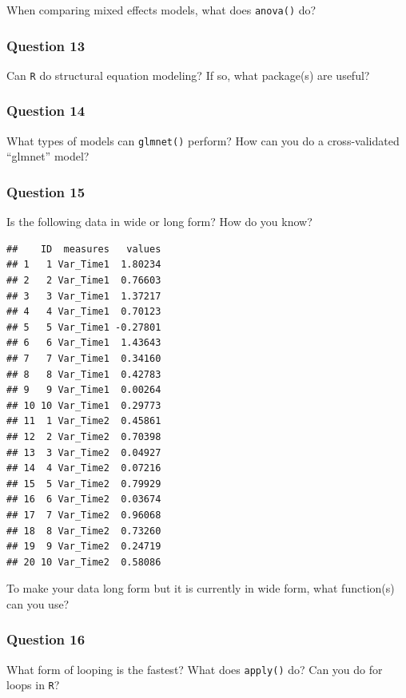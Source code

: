 \documentclass[]{tufte-book}
\theoremstyle{definition}
\theoremstyle{definition}
\theoremstyle{remark}
\begin{document}
When comparing mixed effects models, what does \texttt{anova()} do?

\subsubsection*{Question 13}\label{question-13}

Can \texttt{R} do structural equation modeling? If so, what package(s)
are useful?

\subsubsection*{Question 14}\label{question-14}

What types of models can \texttt{glmnet()} perform? How can you do a
cross-validated ``glmnet'' model?

\subsubsection*{Question 15}\label{question-15}

Is the following data in wide or long form? How do you know?

\begin{verbatim}
##    ID  measures   values
## 1   1 Var_Time1  1.80234
## 2   2 Var_Time1  0.76603
## 3   3 Var_Time1  1.37217
## 4   4 Var_Time1  0.70123
## 5   5 Var_Time1 -0.27801
## 6   6 Var_Time1  1.43643
## 7   7 Var_Time1  0.34160
## 8   8 Var_Time1  0.42783
## 9   9 Var_Time1  0.00264
## 10 10 Var_Time1  0.29773
## 11  1 Var_Time2  0.45861
## 12  2 Var_Time2  0.70398
## 13  3 Var_Time2  0.04927
## 14  4 Var_Time2  0.07216
## 15  5 Var_Time2  0.79929
## 16  6 Var_Time2  0.03674
## 17  7 Var_Time2  0.96068
## 18  8 Var_Time2  0.73260
## 19  9 Var_Time2  0.24719
## 20 10 Var_Time2  0.58086
\end{verbatim}

To make your data long form but it is currently in wide form, what
function(s) can you use?

\subsubsection*{Question 16}\label{question-16}

What form of looping is the fastest? What does \texttt{apply()} do? Can
you do for loops in \texttt{R}?
\end{document}
